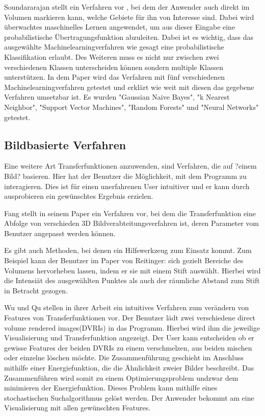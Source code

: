 Soundararajan stellt ein Verfahren vor \cite{soundararajan2015learning}, bei dem  der Anwender auch direkt im Volumen markieren kann, welche Gebiete für ihn von Interesse sind.
\newline
Dabei wird überwachtes maschinelles Lernen angewendet, um aus dieser Eingabe eine probabilistische Übertragungsfunktion abzuleiten. Dabei ist es wichtig, dass das ausgewählte Machinelearningverfahren wie gesagt eine probabilistische Klassifikation erlaubt. Des Weiteren muss es nicht nur zwischen zwei verschiedenen Klassen unterscheiden können sondern multiple Klassen unterstützen.
\newline
In dem Paper wird das Verfahren mit fünf verschiedenen Machinelearningverfahren getestet und erklärt wie weit mit diesen das gegebene Verfahren umsetzbar ist. Es wurden "Gaussian Naive Bayes", "k Nearest Neighbor", "Support Vector Machines", "Random Forests" und "Neural Networks" getestet.






\subsection{Bildbasierte Verfahren}
Eine weitere Art Transferfunktionen anzuwenden, sind Verfahren, die auf ?einem Bild? basieren. Hier hat der Benutzer die Möglichkeit, mit dem Programm zu interagieren. Dies ist für einen unerfahrenen User intuitiver und er kann durch ausprobieren ein gewünschtes Ergebnis erzielen.

Fang stellt in seinem Paper \cite{fang1998image} ein Verfahren vor, bei dem die  Transferfunktion eine Abfolge von verschieden 3D Bildverabteitungsverfahren ist, deren Parameter vom Benutzer angepasst werden können.

Es gibt auch Methoden, bei denen ein Hilfswerkzeug zum Einsatz kommt. Zum Beispiel kann der Benutzer im Paper von Reitinger: \cite{reitinger2004user} sich gezielt Bereiche des Volumens hervorheben lassen, indem er sie mit einem Stift auswählt. Hierbei wird die Intensiät des ausgewählten Punktes als auch der räumliche Abstand zum Stift in Betracht gezogen.

Wu und Qu stellen in ihrer Arbeit \cite{wu2007interactive} ein intuitives Verfahren zum verändern von Features von Transferfunktionen vor.
\newline
Der Benutzer lädt zwei verschiedene direct volume rendered images(DVRIs) in das Programm. Hierbei wird ihm die jeweilige Visualisierung und Transferfunktion angezeigt. Der User kann entscheiden ob er gewisse Features der beiden DVRIs zu einem verschmelzen, aus beiden mischen oder einzelne löschen möchte. Die Zusammenführung geschieht im Anschluss mithilfe einer Energiefunktion, die die Ähnlichkeit zweier Bilder beschreibt. Das Zusammenführen wird somit zu einem Optimierungsproblem undzwar dem minimieren der Energiefunktion. Dieses Problem kann mithilfe eines stochastischen Suchalgorithmus gelöst werden. Der Anwender bekommt am eine Visualisierung mit allen gewünschten Features.




